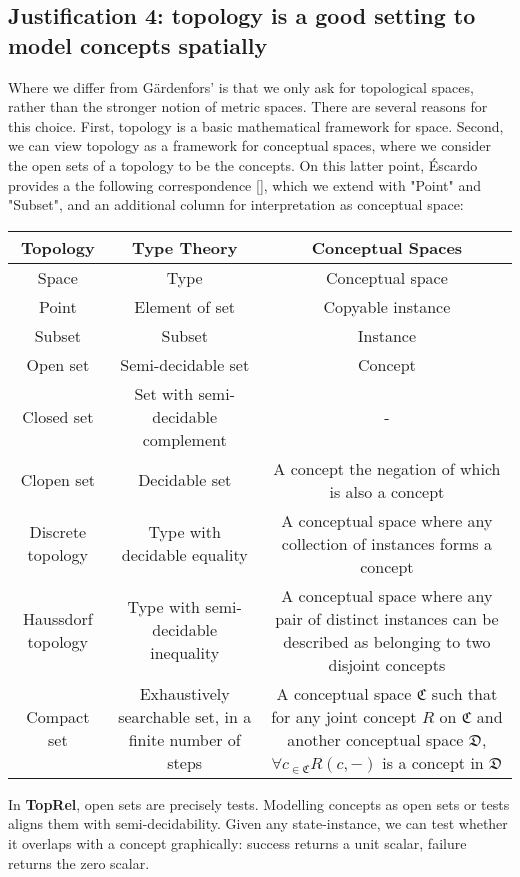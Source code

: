 \begin{fullwidth}
\begin{requirement}

\end{requirement}

\subsection{Justification 4: topology is a good setting to model concepts spatially}

Where we differ from G\"{a}rdenfors' is that we only ask for topological spaces, rather than the stronger notion of metric spaces. There are several reasons for this choice. First, topology is a basic mathematical framework for space. Second, we can view topology as a framework for conceptual spaces, where we consider the open sets of a topology to be the concepts. On this latter point, \'{E}scardo provides a the following correspondence [], which we extend with "Point" and "Subset", and an additional column for interpretation as conceptual space:

\begin{table}[]
\begin{tabular}{|c|c|c|}
\hline
\textbf{Topology} & \textbf{Type Theory} & \textbf{Conceptual Spaces}  \\ \hline
Space & Type & Conceptual space \\  \hline
Point & Element of set & Copyable instance \\  \hline
Subset & Subset & Instance \\  \hline
Open set & Semi-decidable set & Concept \\ \hline
Closed set & Set with semi-decidable complement & - \\ \hline
Clopen set & Decidable set & A concept the negation of which is also a concept \\ \hline
Discrete topology & Type with decidable equality & A conceptual space where any collection of instances forms a concept \\ \hline
Haussdorf topology & Type with semi-decidable inequality & A conceptual space where any pair of distinct instances can be described as belonging to two disjoint concepts \\ \hline
Compact set & Exhaustively searchable set, in a finite number of steps & A conceptual space $\mathfrak{C}$ such that for any joint concept $R$ on $\mathfrak{C}$ and another conceptual space $\mathfrak{D}$, $\forall c_{ \in \mathfrak{C}}R(c,-)$ is a concept in $\mathfrak{D}$ \\ \hline
\end{tabular}
\end{table}

In \textbf{TopRel}, open sets are precisely tests. Modelling concepts as open sets or tests aligns them with semi-decidability. Given any state-instance, we can test whether it overlaps with a concept graphically: success returns a unit scalar, failure returns the zero scalar.

\end{fullwidth}
